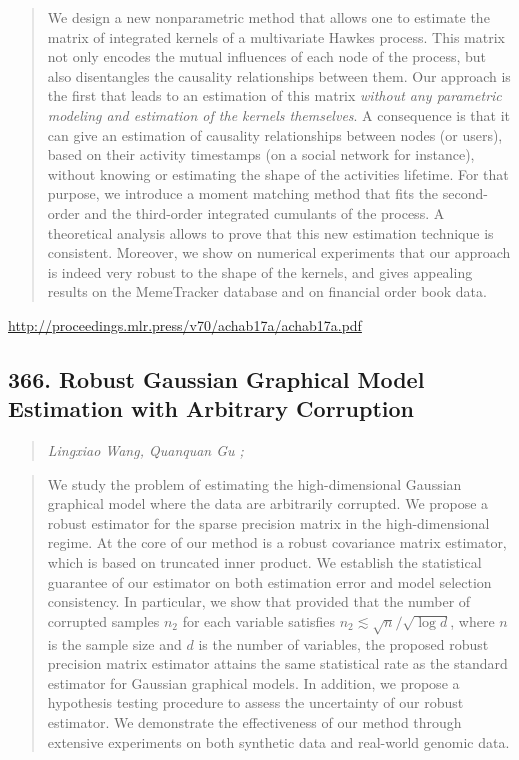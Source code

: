 \documentclass{article}
\begin{document}
\begin{quote}
    We design a new nonparametric method that allows one to estimate the matrix of integrated kernels of a multivariate Hawkes process. This matrix not only encodes the mutual influences of each node of the process, but also disentangles the causality relationships between them. Our approach is the first that leads to an estimation of this matrix \textit{without any parametric modeling and estimation of the kernels themselves}. A consequence is that it can give an estimation of causality relationships between nodes (or users), based on their activity timestamps (on a social network for instance), without knowing or estimating the shape of the activities lifetime. For that purpose, we introduce a moment matching method that fits the second-order and the third-order integrated cumulants of the process. A theoretical analysis allows to prove that this new estimation technique is consistent. Moreover, we show on numerical experiments that our approach is indeed very robust to the shape of the kernels, and gives appealing results on the MemeTracker database and on financial order book data.  
\end{quote}

\href{http://proceedings.mlr.press/v70/achab17a/achab17a.pdf}{http://proceedings.mlr.press/v70/achab17a/achab17a.pdf}

\subsection{366. Robust Gaussian Graphical Model Estimation with Arbitrary Corruption}

\begin{quote}
\footnotesize{\textit{Lingxiao Wang, Quanquan Gu ;}}

\end{quote}

\begin{quote}
    We study the problem of estimating the high-dimensional Gaussian graphical model where the data are arbitrarily corrupted. We propose a robust estimator for the sparse precision matrix in the high-dimensional regime. At the core of our method is a robust covariance matrix estimator, which is based on truncated inner product. We establish the statistical guarantee of our estimator on both estimation error and model selection consistency. In particular, we show that provided that the number of corrupted samples $n_2$ for each variable satisfies $n_2 \lesssim \sqrt{n}/\sqrt{\log d}$, where $n$ is the sample size and $d$ is the number of variables, the proposed robust precision matrix estimator attains the same statistical rate as the standard estimator for Gaussian graphical models. In addition, we propose a hypothesis testing procedure to assess the uncertainty of our robust estimator. We demonstrate the effectiveness of our method through extensive experiments on both synthetic data and real-world genomic data.  
\end{quote}
\end{document}
